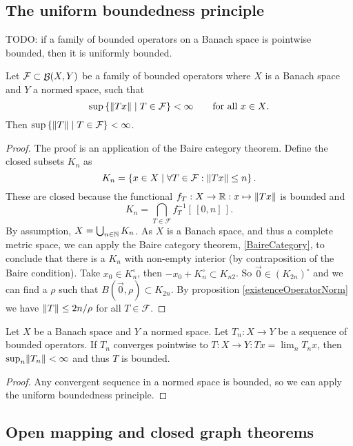 \subsection{The uniform boundedness principle}
TODO: if a family of bounded operators on a Banach space is pointwise bounded, then it is uniformly bounded.
\begin{theorem}
Let $\mathcal{F}\subset \mathop{\mathcal{B}}(X,Y)$ be a family of bounded operators where $X$ is a Banach space and $Y$ a normed space, such that
\[ \sup\left\{ \lVert Tx\rVert \;\middle|\; T\in\mathcal{F} \right\} < \infty \qquad \text{for all $x\in X$}. \]
Then $\sup\left\{ \lVert T\rVert \;\middle|\; T\in\mathcal{F} \right\} < \infty$.
\end{theorem}
\begin{proof}
The proof is an application of the Baire category theorem. Define the closed subsets $K_n$ as
\[ K_n = \left\{ x\in X \;\middle|\; \forall T\in\mathcal{F}: \lVert Tx\rVert\leq n \right\}. \]
These are closed because the functional $f_T: X\to \mathbb{R}: x\mapsto \lVert Tx\rVert$ is bounded and
\[ K_n = \bigcap_{T\in\mathcal{F}}f_T^{-1}[\,[0,n]\,]. \]
By assumption, $X=\bigcup_{n\in\mathbb{N}} K_n$. As $X$ is a Banach space, and thus a complete metric space, we can apply the Baire category theorem, \ref{BaireCategory}, to conclude that there is a $K_n$ with non-empty interior (by contraposition of the Baire condition). Take $x_0\in K_n^\circ$, then $-x_0+K_n^\circ \subset K_{n2}$. So $\vec{0}\in (K_{2n})^\circ$ and we can find a $\rho$ such that $B(\vec{0},\rho)\subset K_{2n}$. By proposition \ref{existenceOperatorNorm} we have $\lVert T\rVert\leq 2n/\rho$ for all $T\in\mathcal{F}$.
\end{proof}
\begin{corollary}
Let $X$ be a Banach space and $Y$ a normed space. Let $T_n: X\to Y$ be a sequence of bounded operators. If $T_n$ converges pointwise to $T:X\to Y: Tx = \lim_n T_n x$, then $\sup_n\lVert T_n\rVert <\infty$ and thus $T$ is bounded.
\end{corollary}
\begin{proof}
Any convergent sequence in a normed space is bounded, so we can apply the uniform boundedness principle.
\end{proof}

\subsection{Open mapping and closed graph theorems}

